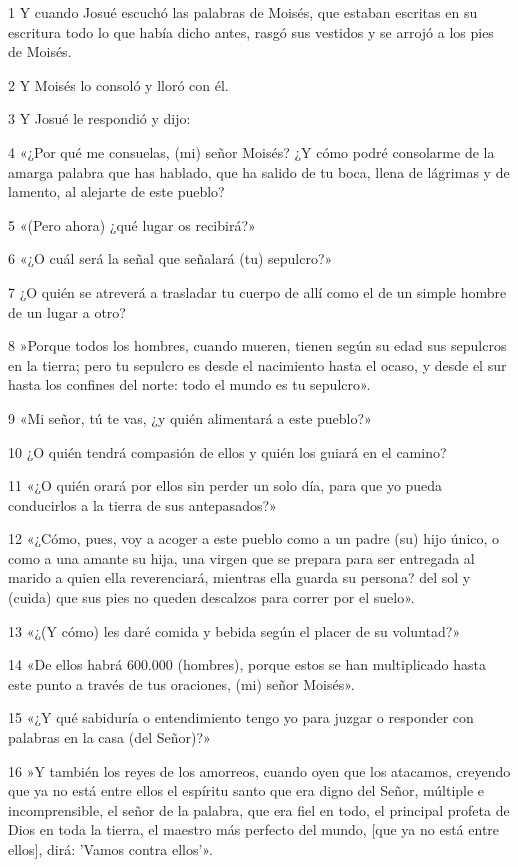 \par 1 Y cuando Josué escuchó las palabras de Moisés, que estaban escritas en su escritura todo lo que había dicho antes, rasgó sus vestidos y se arrojó a los pies de Moisés.
\par 2 Y Moisés lo consoló y lloró con él.
\par 3 Y Josué le respondió y dijo:
\par 4 «¿Por qué me consuelas, (mi) señor Moisés? ¿Y cómo podré consolarme de la amarga palabra que has hablado, que ha salido de tu boca, llena de lágrimas y de lamento, al alejarte de este pueblo?
\par 5 «(Pero ahora) ¿qué lugar os recibirá?»
\par 6 «¿O cuál será la señal que señalará (tu) sepulcro?»
\par 7 ¿O quién se atreverá a trasladar tu cuerpo de allí como el de un simple hombre de un lugar a otro?
\par 8 »Porque todos los hombres, cuando mueren, tienen según su edad sus sepulcros en la tierra; pero tu sepulcro es desde el nacimiento hasta el ocaso, y desde el sur hasta los confines del norte: todo el mundo es tu sepulcro».
\par 9 «Mi señor, tú te vas, ¿y quién alimentará a este pueblo?»
\par 10 ¿O quién tendrá compasión de ellos y quién los guiará en el camino?
\par 11 «¿O quién orará por ellos sin perder un solo día, para que yo pueda conducirlos a la tierra de sus antepasados?»
\par 12 «¿Cómo, pues, voy a acoger a este pueblo como a un padre (su) hijo único, o como a una amante su hija, una virgen que se prepara para ser entregada al marido a quien ella reverenciará, mientras ella guarda su persona? del sol y (cuida) que sus pies no queden descalzos para correr por el suelo».
\par 13 «¿(Y cómo) les daré comida y bebida según el placer de su voluntad?»
\par 14 «De ellos habrá 600.000 (hombres), porque estos se han multiplicado hasta este punto a través de tus oraciones, (mi) señor Moisés».
\par 15 «¿Y qué sabiduría o entendimiento tengo yo para juzgar o responder con palabras en la casa (del Señor)?»
\par 16 »Y también los reyes de los amorreos, cuando oyen que los atacamos, creyendo que ya no está entre ellos el espíritu santo que era digno del Señor, múltiple e incomprensible, el señor de la palabra, que era fiel en todo, el principal profeta de Dios en toda la tierra, el maestro más perfecto del mundo, [que ya no está entre ellos], dirá: 'Vamos contra ellos'».
